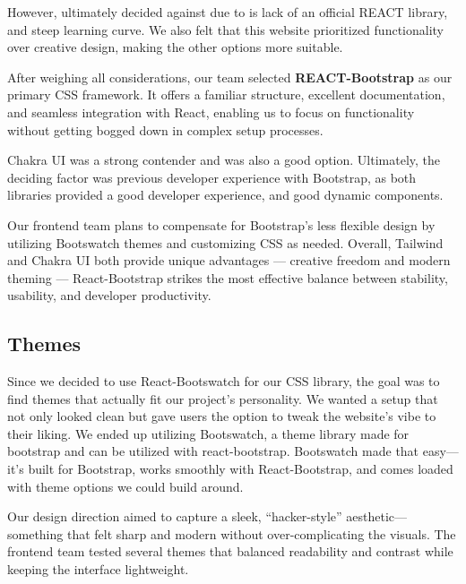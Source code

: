 \documentclass[12pt,titlepage]{article}
\begin{document}
However, ultimately decided against due to is lack of an official REACT library, and steep learning curve.
We also felt that this website prioritized functionality over creative design, making the other options more suitable.

After weighing all considerations, our team selected \textbf{REACT-Bootstrap} as our primary CSS framework. 
It offers a familiar structure, excellent documentation, and seamless integration with React, 
enabling us to focus on functionality without getting bogged down in complex setup processes.

Chakra UI was a strong contender and was also a good option. 
Ultimately, the deciding factor was previous developer experience with Bootstrap, as both libraries provided a good developer experience,
and good dynamic components.

Our frontend team plans to compensate for Bootstrap's less flexible design by utilizing Bootswatch themes and customizing CSS as needed.
Overall, Tailwind and Chakra UI both provide unique advantages — creative freedom and modern theming — 
React-Bootstrap strikes the most effective balance between stability, usability, and developer productivity.


\subsection{Themes}
Since we decided to use React-Bootswatch for our CSS library, the goal was to find themes that actually fit our project’s personality.
We wanted a setup that not only looked clean but gave users the option to tweak the website’s vibe to their liking.
We ended up utilizing Bootswatch, a theme library made for bootstrap and can be utilized with react-bootstrap.
Bootswatch made that easy—it’s built for Bootstrap, works smoothly with React-Bootstrap, and comes loaded with theme options we could build around.

Our design direction aimed to capture a sleek, “hacker-style” aesthetic—something that felt sharp and modern without over-complicating the visuals.
The frontend team tested several themes that balanced readability and contrast while keeping the interface lightweight.
\end{document}
